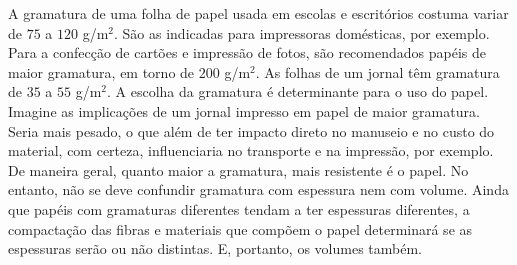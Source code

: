 \begin{knowledge}{}

A gramatura de uma folha de papel usada em escolas e escritórios costuma variar de $75$ a \(120\) g/m$^2$.  São as indicadas para impressoras domésticas, por exemplo. Para a confecção de cartões e impressão de fotos, são recomendados papéis de maior gramatura, em torno de \(200\) g/m$^2$.  As folhas de um jornal têm gramatura de $35$ a \(55\) g/m$^2$.  A escolha da gramatura é determinante para o uso do papel. Imagine as implicações de um jornal impresso em papel de maior gramatura. Seria mais pesado, o que além de ter impacto direto no manuseio e no custo do material, com certeza, influenciaria no transporte e na impressão, por exemplo. De maneira geral, quanto maior a gramatura, mais resistente é o papel. No entanto, não se deve confundir gramatura com espessura nem com volume. Ainda que papéis com gramaturas diferentes tendam a ter espessuras diferentes, a compactação das fibras e materiais que compõem o papel determinará se as espessuras serão ou não distintas. E, portanto, os volumes também.
\end{knowledge}

